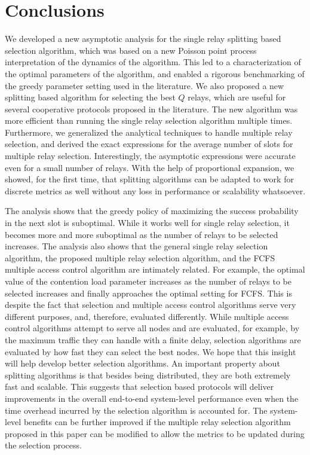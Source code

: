 \documentclass[12pt,draftcls,peerreview, onecolumn]{IEEEtran}
\begin{document}
\section{Conclusions}
\label{sec:conclusions}

We developed a new asymptotic analysis for the single relay splitting
based selection algorithm, which was based on a new Poisson point
process interpretation of the dynamics of the algorithm. This led to a
characterization of the optimal parameters of the algorithm, and
enabled a rigorous benchmarking of the greedy parameter setting used
in the literature. We also proposed a new splitting based algorithm
for selecting the best $Q$ relays, which are useful for several
cooperative protocols proposed in the literature. The new algorithm
was more efficient than running the single relay selection algorithm
multiple times. Furthermore, we generalized the analytical techniques
to handle multiple relay selection, and derived the exact expressions
for the average number of slots for multiple relay selection.
Interestingly, the asymptotic expressions were accurate even for a
small number of relays. With the help of proportional expansion, we
showed, for the first time, that splitting algorithms can be adapted
to work for discrete metrics as well without any loss in performance
or scalability whatsoever.


The analysis shows that the greedy policy of maximizing the success
probability in the next slot is suboptimal. While it works well for
single relay selection, it becomes more and more suboptimal as the
number of relays to be selected increases.  The analysis also shows
that the general single relay selection algorithm, the proposed
multiple relay selection algorithm, and the FCFS multiple access
control algorithm are intimately related. For example, the optimal
value of the contention load parameter increases as the number of
relays to be selected increases and finally approaches the optimal
setting for FCFS.  This is despite the fact that selection and
multiple access control algorithms serve very different purposes, and,
therefore, evaluated differently. While multiple access control
algorithms attempt to serve all nodes and are evaluated, for example,
by the maximum traffic they can handle with a finite delay, selection
algorithms are evaluated by how fast they can select the best nodes.
We hope that this insight will help develop better selection
algorithms.  An important property about splitting algorithms is that
besides being distributed, they are both extremely fast and scalable.
This suggests that selection based protocols will deliver improvements
in the overall end-to-end system-level performance even when the time
overhead incurred by the selection algorithm is accounted for. The
system-level benefits can be further improved if the multiple relay
selection algorithm proposed in this paper can be modified to allow
the metrics to be updated during the selection process.
\end{document}
